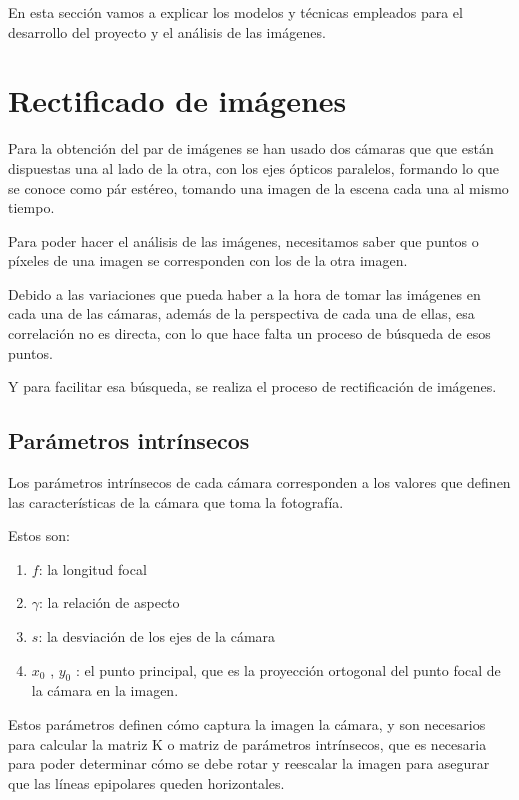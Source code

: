 
En esta sección vamos a explicar los modelos y técnicas empleados para el desarrollo del proyecto y el análisis de las imágenes.

\section{Rectificado de imágenes}

Para la obtención del par de imágenes se han usado dos cámaras que que están dispuestas una al lado de la otra, con los ejes ópticos paralelos, formando lo que se conoce como pár estéreo, tomando una imagen de la escena cada una al mismo tiempo.

Para poder hacer el análisis de las imágenes, necesitamos saber que puntos o píxeles de una imagen se corresponden con los de la otra imagen.

Debido a las variaciones que pueda haber a la hora de tomar las imágenes en cada una de las cámaras, además de la perspectiva de cada una de ellas, esa correlación no es directa, con lo que hace falta un proceso de búsqueda de esos puntos.

Y para facilitar esa búsqueda, se realiza el proceso de rectificación de imágenes.

\subsection{Parámetros intrínsecos}
Los parámetros intrínsecos de cada cámara corresponden a los valores que definen las características de la cámara que toma la fotografía.

Estos son:
\begin{enumerate}
	\item $f$: la longitud focal
	\item $\gamma$: la relación de aspecto
	\item $s$: la desviación de los ejes de la cámara
	\item $x_{0}$ , $y_{0}$ : el punto principal, que es la proyección ortogonal del punto focal de la cámara en la imagen.
\end{enumerate}

Estos parámetros definen cómo captura la imagen la cámara, y son necesarios para calcular la matriz K o matriz de parámetros intrínsecos, que es necesaria para poder determinar cómo se debe rotar y reescalar la imagen para asegurar que las líneas epipolares queden horizontales.

